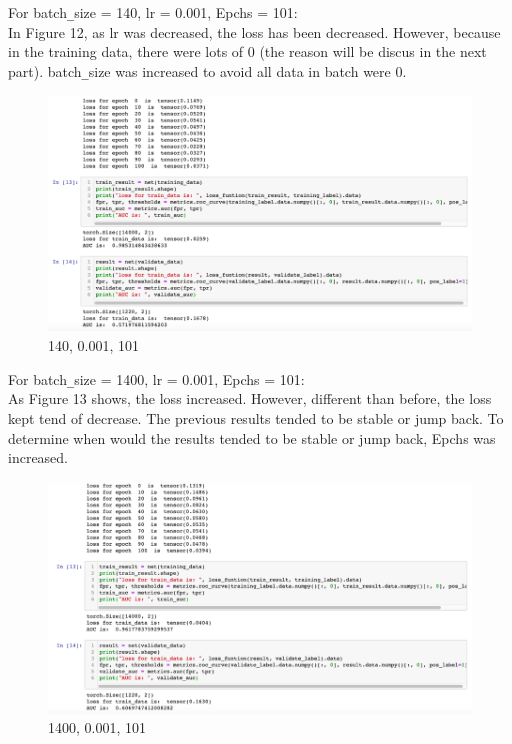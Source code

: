 \documentclass{article}
\begin{document}
For batch\verb+_+size = 140, lr = 0.001, Epchs = 101:\\
In Figure 12, as lr was decreased, the loss has been decreased. However, because in the training data, there were lots of 0 (the reason will be discus in the next part). batch\verb+_+size was increased to avoid all data in batch were 0.

\begin{figure}[H]
  \centering
  \includegraphics[width=1.0\textwidth]{img/Picture 11}
  \caption{140, 0.001, 101}
\end{figure}

For batch\verb+_+size = 1400, lr = 0.001, Epchs = 101:\\
As Figure 13 shows, the loss increased. However, different than before, the loss kept tend of decrease. The previous results tended to be stable or jump back. To determine when would the results tended to be stable or jump back, Epchs was increased.

\begin{figure}[H]
  \centering
  \includegraphics[width=1.0\textwidth]{img/Picture 12}
  \caption{1400, 0.001, 101}
\end{figure}
\end{document}
